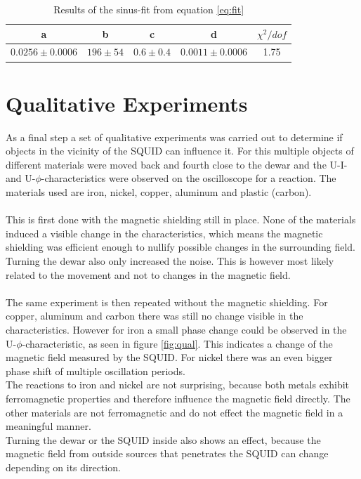 \documentclass[12pt,a4paper]{article}
\begin{document}
\begin{table}
\center
\begin{tabular}{|c|c|c|c|c|}
\hline 
a & b & c & d & $\chi^2/dof$ \\ 
\hline 
$0.0256\pm0.0006$ & $196\pm 54$ & $0.6\pm0.4$ & $0.0011\pm0.0006$  & 1.75 \\ 
\hline 
\end{tabular}
\caption{Results of the sinus-fit from equation \ref{eq:fit}}
\label{tab:U-phi_fit}
\end{table}

\section{Qualitative Experiments}
As a final step a set of qualitative experiments was carried out to determine if objects in the vicinity of the SQUID can influence it. For this multiple objects of different materials were moved back and fourth close to the dewar and the U-I- and U-$\phi$-characteristics were observed on the oscilloscope for a reaction. The materials used are iron, nickel, copper, aluminum and plastic (carbon).\\
\\
This is first done with the magnetic shielding still in place. None of the materials induced a visible change in the characteristics, which means the magnetic shielding was efficient enough to nullify possible changes in the surrounding field. Turning the dewar also only increased the noise. This is however most likely related to the movement and not to changes in the magnetic field.\\
\\
The same experiment is then repeated without the magnetic shielding. For copper, aluminum and carbon there was still no change visible in the characteristics. However for iron a small phase change could be observed in the U-$\phi$-characteristic, as seen in figure \ref{fig:qual}. This indicates a change of the magnetic field measured by the SQUID. For nickel there was an even bigger phase shift of multiple oscillation periods.\\
The reactions to iron and nickel are not surprising, because both metals exhibit ferromagnetic properties and therefore influence the magnetic field directly. The other materials are not ferromagnetic and do not effect the magnetic field in a meaningful manner.\\
Turning the dewar or the SQUID inside also shows an effect, because the magnetic field from outside sources that penetrates the SQUID can change depending on its direction.
\end{document}
